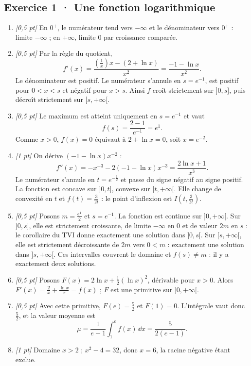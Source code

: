 \subsection*{Exercice 1 · Une fonction logarithmique}\begin{enumerate}

\item \textit{[0,5 pt]} En $0^+$, le numérateur tend vers $-\infty$ et le dénominateur vers $0^+$ : limite $-\infty$ ; en $+\infty$, limite $0$ par croissance comparée.

\item \textit{[0,5 pt]} Par la règle du quotient,
\[f'(x)=\frac{(\frac{1}{x})x-(2+\ln x)}{x^2}=\frac{-1-\ln x}{x^2}.\]
Le dénominateur est positif. Le numérateur s'annule en $s=e^{-1}$, est positif pour $0<x<s$ et négatif pour $x>s$. Ainsi $f$ croît strictement sur $]0,s]$, puis décroît strictement sur $[s,+\infty[$.

\item \textit{[0,5 pt]} Le maximum est atteint uniquement en $s=e^{-1}$ et vaut
\[f(s)=\frac{2- 1}{e^{-1}}=e^{1}.\]
Comme $x>0$, $f(x)=0$ équivaut à $2+\ln x=0$, soit $x=e^{-2}$.

\item \textit{[1 pt]} On dérive $(-1-\ln x)x^{-2}$ :
\[f''(x)=-x^{-3}-2(-1-\ln x)x^{-3}=\frac{2\ln x+1}{x^3}.\]
Le numérateur s'annule en $t=e^{-\frac{1}{2}}$ et passe du signe négatif au signe positif. La fonction est concave sur $]0,t]$, convexe sur $[t,+\infty[$. Elle change de convexité en $t$ et $f(t)=\frac{3}{2t}$ : le point d'inflexion est $I(t,\frac{3}{2t})$.

\item \textit{[0,5 pt]} Posons $m=\frac{e^{1}}{2}$ et $s=e^{-1}$. La fonction est continue sur $]0,+\infty[$. Sur $]0,s]$, elle est strictement croissante, de limite $-\infty$ en $0$ et de valeur $2m$ en $s$ : le corollaire du TVI donne exactement une solution dans $]0,s[$. Sur $[s,+\infty[$, elle est strictement décroissante de $2m$ vers $0<m$ : exactement une solution dans $]s,+\infty[$. Ces intervalles couvrent le domaine et $f(s)\ne m$ : il y a exactement deux solutions.

\item \textit{[0,5 pt]} Posons $F(x)=2\ln x+\frac12(\ln x)^2$, dérivable pour $x>0$. Alors $F'(x)=\frac{2}{x}+\frac{\ln x}{x}=f(x)$ ; $F$ est une primitive sur $]0,+\infty[$.

\item \textit{[0,5 pt]} Avec cette primitive, $F(e)=\frac{5}{2}$ et $F(1)=0$. L'intégrale vaut donc $\frac{5}{2}$, et la valeur moyenne est
\[\mu=\frac{1}{e-1}\int_1^e f(x)\,\dd x=\frac{5}{2(e-1)}.\]

\item \textit{[1 pt]} Domaine $x>2$ ; $x^2-4=32$, donc $x=6$, la racine négative étant exclue.

\end{enumerate}


